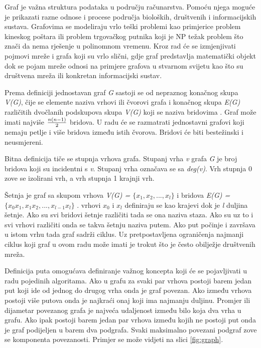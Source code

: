 \documentclass[times, utf8, diplomski]{fer}
\begin{document}
Graf je važna struktura podataka u području računarstva. Pomoću njega moguće je prikazati razne odnose i procese područja bioloških, društvenih i informacijskih sustava. Grafovima se modeliraju vrlo teški problemi kao primjerice problem kineskog poštara ili problem trgovačkog putnika koji je NP težak problem što znači da nema rješenje u polinomnom vremenu. Kroz rad će se izmjenjivati pojmovi mreže i grafa koji su vrlo slični, gdje graf predstavlja matematički objekt dok se pojam mreže odnosi na primjere grafova u stvarnom svijetu kao što su društvena mreža ili konkretan informacijski sustav.

Prema definiciji jednostavan graf \textit{G} sastoji se od nepraznog konačnog skupa \textit{V(G)}, čije se elemente naziva vrhovi ili čvorovi grafa i konačnog skupa \textit{E(G)} različitih dvočlanih podskupova skupa \textit{V(G)} koji se naziva bridovima \cite{nakic_pavcevic_2019}. Graf može imati najviše $ {n(n-1) \over 2} $ bridova. U radu će se razmatrati jednostavni grafovi koji nemaju petlje i više bridova između istih čvorova. Bridovi će biti bestežinski i neusmjereni. 

Bitna definicija tiče se stupnja vrhova grafa. Stupanj vrha \textit{v} grafa \textit{G} je broj bridova koji su incidentni s \textit{v}. Stupanj vrha označava se sa \textit{deg(v)}. Vrh stupnja 0 zove se izolirani vrh, a vrh stupnja 1 krajnji vrh. \cite{nakic_pavcevic_2019}

Šetnja je graf sa skupom vrhova \textit{V(G) = $ \{x_{1},x_{2},...,x_{l}\} $ } i bridova \textit{E(G) = $ \{x_{0}x_{1},x_{1}x_{2},...,x_{l-1}x_{l}\} $ }. vrhovi $ x_{0} $ i $ x_{l} $ definiraju se kao krajevi dok je \textit{l} duljina šetnje. Ako su svi bridovi šetnje različiti tada se ona naziva staza. Ako su uz to i svi vrhovi različiti onda se takva šetnju naziva putem. Ako put počinje i završava u istom vrhu tada graf sadrži ciklus. Uz pretpostavljena ograničenja najmanji ciklus koji graf u ovom radu može imati je trokut što je često obilježje društvenih mreža.

Definicija puta omogućava definiranje važnog koncepta koji će se pojavljivati u radu pojedinih algoritama. Ako u grafu za svaki par vrhova postoji barem jedan put koji ide od jednog do drugog vrha onda je graf povezan. Ako između vrhova postoji više putova onda je najkraći onaj koji ima najmanju duljinu. Promjer ili dijametar povezanog grafa je najveća udaljenost između bilo koja dva vrha u grafu. Ako ipak postoji barem jedan par vrhova između kojih ne postoji put onda je graf podijeljen u barem dva podgrafa. Svaki maksimalno povezani podgraf zove se komponenta povezanosti. Primjer se može vidjeti na slici \ref{fig:graph}.
\end{document}
